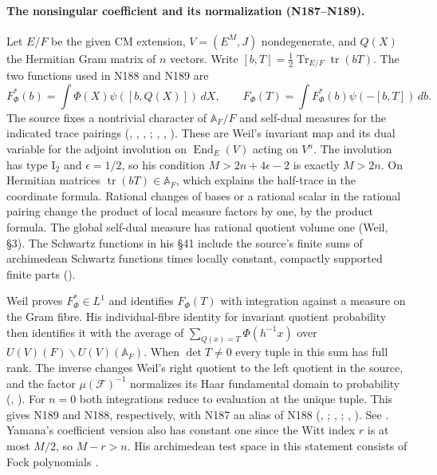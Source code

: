 \paragraph{The nonsingular coefficient and its normalization (N187--N189).}\label{r5:lit:N188}
Let $E/F$ be the given CM extension, $V=(E^M,J)$ nondegenerate, and
$Q(X)$ the Hermitian Gram matrix of $n$ vectors. Write
$[b,T]=\tfrac12\operatorname{Tr}_{E/F}\operatorname{tr}(bT)$.
The two functions used in N188 and N189 are
\[
 F^*_\Phi(b)=\int\Phi(X)\psi([b,Q(X)])\,dX,\qquad
 F_\Phi(T)=\int F^*_\Phi(b)\psi(-[b,T])\,db .
\]
The source fixes a nontrivial character of $\mathbb A_F/F$ and self-dual
measures for the indicated trace pairings (, ,
, ;
, , ).
These are Weil's invariant map and its dual variable for the adjoint
involution on $\operatorname{End}_E(V)$ acting on $V^n$. The involution
has type $\mathrm I_2$ and $\epsilon=1/2$, so his condition
$M>2n+4\epsilon-2$ is exactly $M>2n$. On Hermitian matrices
$\operatorname{tr}(bT)\in\mathbb A_F$, which explains the half-trace in the
coordinate formula. Rational changes of bases or a rational scalar in
the rational pairing change the product of local measure factors by
one, by the product formula. The global self-dual measure has rational
quotient volume one (Weil, \S3). The Schwartz functions in his \S41
include the source's finite sums of archimedean Schwartz functions times
locally constant, compactly supported finite parts
().

Weil proves $F^*_\Phi\in L^1$ and identifies $F_\Phi(T)$ with integration
against a measure on the Gram fibre. His individual-fibre identity for
invariant quotient probability then identifies it with the average of
$\sum_{Q(x)=T}\Phi(h^{-1}x)$ over $U(V)(F)\backslash U(V)(\mathbb A_F)$.
When $\det T\ne0$ every tuple in this sum has full rank. The inverse
changes Weil's right quotient to the left quotient in the source, and
the factor $\mu(\mathcal F)^{-1}$ normalizes its Haar fundamental domain
to probability (, ).
For $n=0$ both integrations reduce to evaluation at the unique tuple.
This gives N189 and N188, respectively, with N187 an alias of N188
(, ;
, ;
, ).
See \cite[\S\S3,41,52, Theorem~5]{T-Weil1965}. Yamana's coefficient
version also has constant one since the Witt index $r$ is at most $M/2$, so
$M-r>n$. His archimedean test space in this statement consists of
Fock polynomials \cite[pp.~236--237, Lemma~3.1]{T-Yamana2013}.

